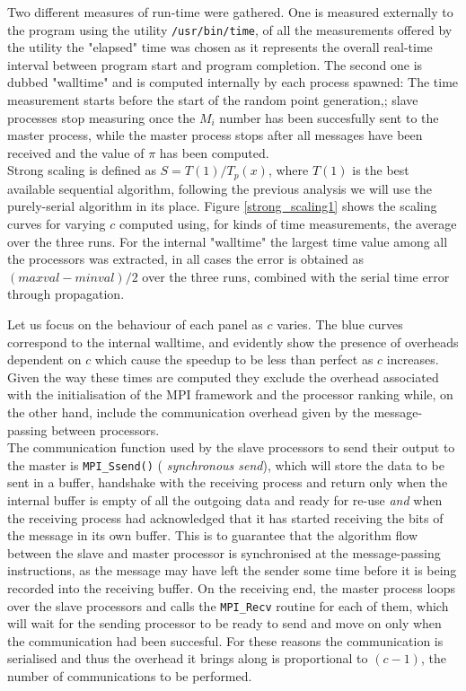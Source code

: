 \documentclass{article}
\begin{document}
Two different measures of run-time were gathered. One is measured externally to the program using the utility \verb|/usr/bin/time|, of all the measurements offered by the utility the "elapsed" time was chosen as it represents the overall real-time interval between program start and program completion. The second one is dubbed "walltime" and is computed internally by each process spawned: The time measurement starts before the start of the random point generation,; slave processes stop measuring once the $M_i$ number has been succesfully sent to the master process, while the master process stops after all messages have been received and the value of $\pi$ has been computed.\\
Strong scaling is defined as $S = T\left( 1 \right) / T_p \left( x \right) $, where $T\left( 1 \right)$ is the best available sequential algorithm, following the previous analysis we will use the purely-serial algorithm in its place. Figure \ref{strong_scaling1} shows the scaling curves for varying $c$ computed using, for kinds of time measurements, the average over the three runs. For the internal "walltime" the largest time value among all the processors was extracted, in all cases the error is obtained as $\left( maxval - minval\right)/2$ over the three runs, combined with the serial time error through propagation.


\par
Let us focus on the behaviour of each panel as $c$ varies.
The blue curves correspond to the internal walltime, and evidently show the presence of overheads dependent on $c$ which cause the speedup to be less than perfect as $c$ increases. Given the way these times are computed they exclude the overhead associated with the initialisation of the MPI framework and the processor ranking while, on the other hand, include the communication overhead given by the message-passing between processors.\\
The communication function used by the slave processors to send their output to the master is \verb|MPI_Ssend()| (\textit{	synchronous send}), which will store the data to be sent in a buffer, handshake with the receiving process and return only when the internal buffer is empty of all the outgoing data and ready for re-use \textit{and} when the receiving process had acknowledged that it has started receiving the bits of the message in its own buffer.  This is to guarantee that the  algorithm flow between the slave and master processor is synchronised at the message-passing instructions, as the message may have left the sender some time before it is being recorded into the receiving buffer. On the receiving end, the master process loops over the slave processors and calls the \verb|MPI_Recv| routine for each of them, which will wait for the sending processor to be ready to send and move on only when the communication had been succesful. For these reasons the communication is serialised and thus the overhead it brings along is proportional to $\left(c - 1\right)$, the number of communications to be performed.
\end{document}
